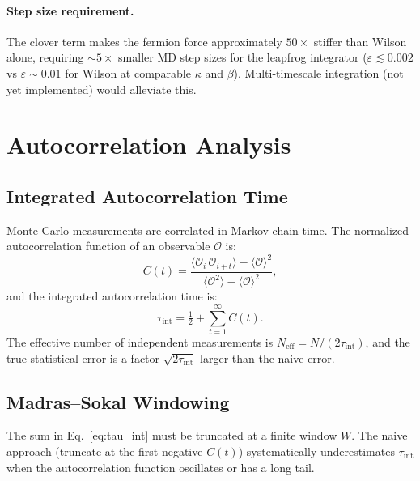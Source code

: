 \documentclass[12pt]{article}
\newcommand{\half}{\tfrac{1}{2}}
\begin{document}
\paragraph{Step size requirement.}
The clover term makes the fermion force approximately $50\times$ stiffer than Wilson alone, requiring $\sim 5\times$ smaller MD step sizes for the leapfrog integrator ($\varepsilon \lesssim 0.002$ vs $\varepsilon \sim 0.01$ for Wilson at comparable $\kappa$ and $\beta$). Multi-timescale integration (not yet implemented) would alleviate this.


\section{Autocorrelation Analysis}
\label{sec:autocorrelation}

\subsection{Integrated Autocorrelation Time}

Monte Carlo measurements are correlated in Markov chain time. The normalized autocorrelation function of an observable $\mathcal{O}$ is:
\begin{equation}
C(t) = \frac{\langle \mathcal{O}_i \, \mathcal{O}_{i+t} \rangle - \langle \mathcal{O} \rangle^2}{\langle \mathcal{O}^2 \rangle - \langle \mathcal{O} \rangle^2},
\end{equation}
and the integrated autocorrelation time is:
\begin{equation}
\label{eq:tau_int}
\tau_{\mathrm{int}} = \half + \sum_{t=1}^{\infty} C(t).
\end{equation}
The effective number of independent measurements is $N_{\mathrm{eff}} = N / (2\tau_{\mathrm{int}})$, and the true statistical error is a factor $\sqrt{2\tau_{\mathrm{int}}}$ larger than the naive error.

\subsection{Madras--Sokal Windowing}

The sum in Eq.~\eqref{eq:tau_int} must be truncated at a finite window $W$. The naive approach (truncate at the first negative $C(t)$) systematically underestimates $\tau_{\mathrm{int}}$ when the autocorrelation function oscillates or has a long tail.
\end{document}
